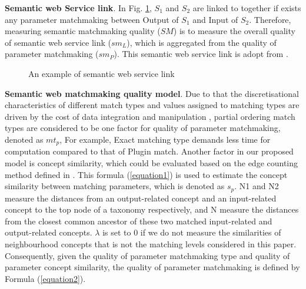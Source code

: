 \documentclass{llncs}
\begin{document}
\textbf{Semantic web Service link}. In Fig. \ref{semanticLink}, $S_{1}$ and $S_{2}$ are linked to together if exists any parameter matchmaking between  Output of $S_1$ and Input of $S_2$.  Therefore, measuring semantic matchmaking quality ($SM$) is to measure the overall quality of semantic web service link ($sm_{L}$), which is aggregated from the quality of parameter matchmaking ($sm_{P}$). This semantic web service link is adopt from \cite{lecue2009optimizing}.

\begin{figure}[h]
\centering
{}
 \caption{ An example of semantic web service link}
 \label{semanticLink}
\end{figure}


\textbf{Semantic web matchmaking quality model}. Due to that the discretisational characteristics of different match types and values assigned to matching types are driven by the cost of data integration and manipulation \cite{lecue2009optimizing}, partial ordering match types are considered to be one factor for quality of parameter matchmaking, denoted as $mt_{p}$,  For example, Exact matching type demands less time for computation compared to that of Plugin match. Another factor in our proposed model is concept similarity, which could be evaluated based on the edge counting method defined in \cite{shet2012new}. This formula (\ref{equation1}) is used to estimate the concept similarity between matching parameters, which is denoted as $s_{p}$. N1 and N2 measure the distances from an output-related concept and an input-related concept to the top node of a taxonomy respectively, and N measure the distances from the closest common ancestor of these two matched input-related and output-related concepts. $\lambda$ is set to 0 if we do not measure the similarities of neighbourhood concepts that is not the matching levels considered in this paper. Consequently, given the quality of parameter matchmaking type and quality of parameter concept similarity, the quality of parameter matchmaking is defined by Formula (\ref{equation2}).
\end{document}

